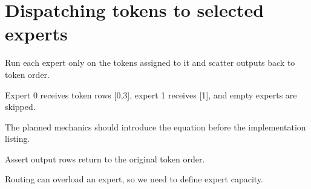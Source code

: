 \section{Dispatching tokens to selected experts}
\label{sec:ch04-dispatching-tokens-to-selected-experts}

Run each expert only on the tokens assigned to it and scatter outputs back to token order.



Expert 0 receives token rows [0,3], expert 1 receives [1], and empty experts are skipped.



The planned mechanics should introduce the equation before the implementation listing.





\begin{checkpointbox}
Assert output rows return to the original token order.
\end{checkpointbox}

Routing can overload an expert, so we need to define expert capacity.
